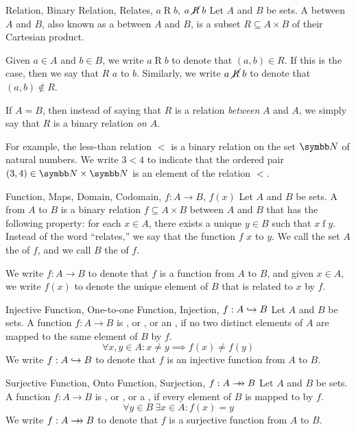 \documentclass[12pt]{report}
\begin{document}
\begin{dfnbox}{Relation, Binary Relation, Relates, $a \mathrel{R} b$, $a \mathrel{\cancel{R}} b$}
	Let $A$ and $B$ be sets. A  between $A$ and $B$, also known as a  between $A$ and $B$, is a subset $R \subseteq A \times B$ of their Cartesian product.

	Given $a \in A$ and $b \in B$, we write $a \mathrel{R} b$ to denote that  $(a, b) \in R$. If this is the case, then we say that $R$  $a$ to $b$. Similarly, we write $a \mathrel{\cancel{R}} b$ to denote that $(a, b) \notin R$.

	If $A = B$, then instead of saying that $R$ is a relation \textit{between} $A$ and $A$, we simply say that $R$ is a binary relation \textit{on} $A$.
\end{dfnbox}

For example, the less-than relation $<$ is a binary relation on the set $\N$ of natural numbers. We write $3 < 4$ to indicate that the ordered pair $(3, 4) \in \N \times \N$ is an element of the relation $<$.

\begin{dfnbox}{Function, Maps, Domain, Codomain, $f: A \to B$, $f(x)$}
	Let $A$ and $B$ be sets. A  from $A$ to $B$ is a binary relation $f \subseteq A \times B$ between $A$ and $B$ that has the following property: for each $x \in A$, there exists a unique $y \in B$ such that $x \mathrel{f} y$. Instead of the word ``relates,'' we say that the function $f$  $x$ to $y$. We call the set $A$ the  of $f$, and we call $B$ the  of $f$.

	We write $f: A \to B$ to denote that $f$ is a function from $A$ to $B$, and given $x \in A$, we write $f(x)$ to denote the unique element of $B$ that is related to $x$ by $f$.
\end{dfnbox}

\begin{dfnbox}{Injective Function, One-to-one Function, Injection, $f: A \hookrightarrow B$}
	Let $A$ and $B$ be sets. A function $f: A \to B$ is , or , or an , if no two distinct elements of $A$ are mapped to the same element of $B$ by $f$.
	\[ \forall x, y \in A : x \ne y \implies f(x) \ne f(y) \]
	We write $f: A \hookrightarrow B$ to denote that $f$ is an injective function from $A$ to $B$.
\end{dfnbox}

\begin{dfnbox}{Surjective Function, Onto Function, Surjection, $f: A \to\!\!\!\!\to B$}
	Let $A$ and $B$ be sets. A function $f: A \to B$ is , or , or a , if every element of $B$ is mapped to by $f$.
	\[ \forall y \in B \ \exists x \in A : f(x) = y \]
	We write $f: A \to\!\!\!\!\to B$ to denote that $f$ is a surjective function from $A$ to $B$.
\end{dfnbox}
\end{document}
